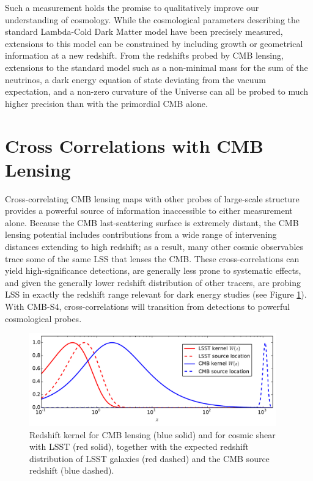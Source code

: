  
Such a measurement holds the promise to qualitatively improve our understanding of cosmology.  While the cosmological parameters describing the standard 
Lambda-Cold Dark Matter model have been precisely measured, extensions to this model can be constrained by including growth or geometrical information at a new redshift.  From the redshifts probed by CMB lensing, extensions to the standard model such as a non-minimal mass for the sum of the neutrinos, a dark energy equation of state deviating from the vacuum expectation, and a non-zero curvature of the Universe can all be probed to much higher precision than with the primordial CMB alone. 



\section{Cross Correlations with CMB Lensing}\label{cross}

Cross-correlating CMB lensing maps with other probes of large-scale structure provides a powerful source of information inaccessible to either measurement alone.
Because the CMB last-scattering surface is extremely distant, 
the CMB lensing potential includes contributions from a wide range of 
intervening distances extending to high redshift; as a result, many other cosmic observables trace some of the same LSS that lenses the CMB.
These cross-correlations can yield high-significance detections, are generally less prone to systematic effects, and given the generally lower redshift distribution of other tracers, are probing LSS in exactly the redshift
range relevant for dark energy studies (see Figure \ref{cmb-gal-kernels}). 
With CMB-S4, cross-correlations will transition from detections to powerful cosmological probes. 

\begin{figure}[htbp]
\centering
\includegraphics[width=0.95\textwidth]{CMBLensing/CMB_effs.pdf}
\caption{Redshift kernel for CMB lensing (blue solid) and for cosmic shear with LSST (red solid), together with the expected redshift distribution of LSST galaxies (red dashed) and the CMB source redshift (blue dashed).}
\label{cmb-gal-kernels}
\end{figure}

